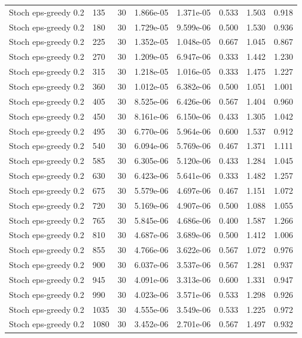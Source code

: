 \begin{scriptsize}
\begin{longtable}{llrrrrrr}
Stoch eps-greedy 0.2 & 135 & 30 & 1.866e-05 & 1.371e-05 & 0.533 & 1.503 & 0.918 \\
Stoch eps-greedy 0.2 & 180 & 30 & 1.729e-05 & 9.599e-06 & 0.500 & 1.530 & 0.936 \\
Stoch eps-greedy 0.2 & 225 & 30 & 1.352e-05 & 1.048e-05 & 0.667 & 1.045 & 0.867 \\
Stoch eps-greedy 0.2 & 270 & 30 & 1.209e-05 & 6.947e-06 & 0.333 & 1.442 & 1.230 \\
Stoch eps-greedy 0.2 & 315 & 30 & 1.218e-05 & 1.016e-05 & 0.333 & 1.475 & 1.227 \\
Stoch eps-greedy 0.2 & 360 & 30 & 1.012e-05 & 6.382e-06 & 0.500 & 1.051 & 1.001 \\
Stoch eps-greedy 0.2 & 405 & 30 & 8.525e-06 & 6.426e-06 & 0.567 & 1.404 & 0.960 \\
Stoch eps-greedy 0.2 & 450 & 30 & 8.161e-06 & 6.150e-06 & 0.433 & 1.305 & 1.042 \\
Stoch eps-greedy 0.2 & 495 & 30 & 6.770e-06 & 5.964e-06 & 0.600 & 1.537 & 0.912 \\
Stoch eps-greedy 0.2 & 540 & 30 & 6.094e-06 & 5.769e-06 & 0.467 & 1.371 & 1.111 \\
Stoch eps-greedy 0.2 & 585 & 30 & 6.305e-06 & 5.120e-06 & 0.433 & 1.284 & 1.045 \\
Stoch eps-greedy 0.2 & 630 & 30 & 6.423e-06 & 5.641e-06 & 0.333 & 1.482 & 1.257 \\
Stoch eps-greedy 0.2 & 675 & 30 & 5.579e-06 & 4.697e-06 & 0.467 & 1.151 & 1.072 \\
Stoch eps-greedy 0.2 & 720 & 30 & 5.169e-06 & 4.907e-06 & 0.500 & 1.088 & 1.055 \\
Stoch eps-greedy 0.2 & 765 & 30 & 5.845e-06 & 4.686e-06 & 0.400 & 1.587 & 1.266 \\
Stoch eps-greedy 0.2 & 810 & 30 & 4.687e-06 & 3.689e-06 & 0.500 & 1.412 & 1.006 \\
Stoch eps-greedy 0.2 & 855 & 30 & 4.766e-06 & 3.622e-06 & 0.567 & 1.072 & 0.976 \\
Stoch eps-greedy 0.2 & 900 & 30 & 6.037e-06 & 3.537e-06 & 0.567 & 1.281 & 0.937 \\
Stoch eps-greedy 0.2 & 945 & 30 & 4.091e-06 & 3.313e-06 & 0.600 & 1.331 & 0.947 \\
Stoch eps-greedy 0.2 & 990 & 30 & 4.023e-06 & 3.571e-06 & 0.533 & 1.298 & 0.926 \\
Stoch eps-greedy 0.2 & 1035 & 30 & 4.555e-06 & 3.549e-06 & 0.533 & 1.225 & 0.972 \\
Stoch eps-greedy 0.2 & 1080 & 30 & 3.452e-06 & 2.701e-06 & 0.567 & 1.497 & 0.932 \\

\end{longtable}
\end{scriptsize}

